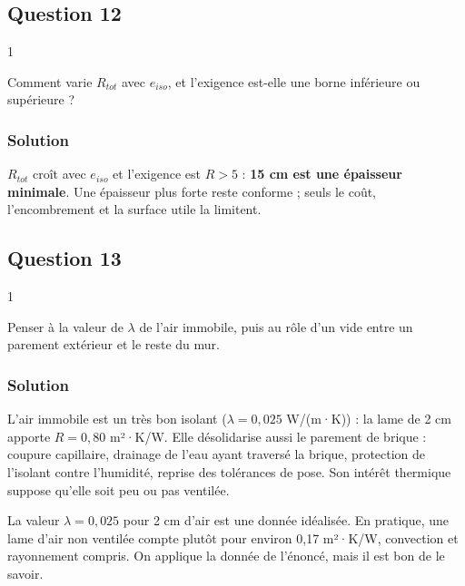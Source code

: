 \documentclass[11pt,a4paper]{article}
\begin{document}
\hypertarget{question-12}{%
\subsection{Question 12}\label{question-12}}

\begin{indication}{1}

Comment varie \(R_{tot}\) avec \(e_{iso}\), et l'exigence est-elle une borne inférieure ou supérieure ?

\end{indication}

\hypertarget{solution-11}{%
\subsubsection{Solution}\label{solution-11}}

\(R_{tot}\) croît avec \(e_{iso}\) et l'exigence est \(R>5\) : \textbf{15 cm est une épaisseur minimale}. Une épaisseur plus forte reste conforme ; seuls le coût, l'encombrement et la surface utile la limitent.

\hypertarget{question-13}{%
\subsection{Question 13}\label{question-13}}

\begin{indication}{1}

Penser à la valeur de \(\lambda\) de l'air immobile, puis au rôle d'un vide entre un parement extérieur et le reste du mur.

\end{indication}

\hypertarget{solution-12}{%
\subsubsection{Solution}\label{solution-12}}

L'air immobile est un très bon isolant (\(\lambda=0{,}025\) W/(m·K)) : la lame de 2 cm apporte \(R=0{,}80\) m²·K/W. Elle désolidarise aussi le parement de brique : coupure capillaire, drainage de l'eau ayant traversé la brique, protection de l'isolant contre l'humidité, reprise des tolérances de pose. Son intérêt thermique suppose qu'elle soit peu ou pas ventilée.

\begin{methode}

La valeur \(\lambda=0{,}025\) pour 2 cm d'air est une donnée idéalisée. En pratique, une lame d'air non ventilée compte plutôt pour environ 0,17 m²·K/W, convection et rayonnement compris. On applique la donnée de l'énoncé, mais il est bon de le savoir.

\end{methode}
\end{document}

